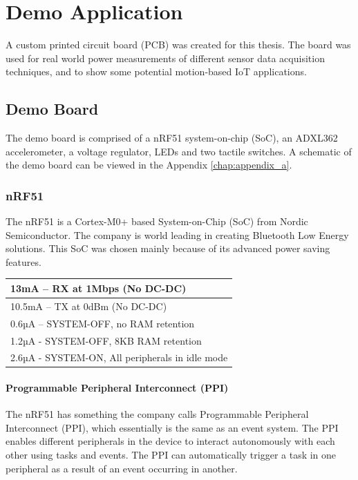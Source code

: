 \chapter{Demo Application}

A custom printed circuit board (PCB) was created for this thesis. The board was used for real world power measurements of different sensor data acquisition techniques, and to show some potential motion-based IoT applications. 

\section{Demo Board}

The demo board is comprised of a nRF51 system-on-chip (SoC), an ADXL362 accelerometer, a voltage regulator, LEDs and two tactile switches. 
A schematic of the demo board can be viewed in the Appendix \ref{chap:appendix_a}. 

\subsection{nRF51}

The nRF51 is a Cortex-M0+ based System-on-Chip (SoC) from Nordic Semiconductor. The company is world leading in creating Bluetooth Low Energy solutions. This SoC was chosen mainly because of its advanced power saving features. 

\begin{center}
    \begin{tabular}{| l |}
    \hline
    13mA – RX at 1Mbps (No DC-DC) \\ \hline
    10.5mA – TX at 0dBm (No DC-DC) \\ \hline
    0.6µA – SYSTEM-OFF, no RAM retention \\ \hline
    1.2µA - SYSTEM-OFF, 8KB RAM retention \\ \hline
    2.6µA - SYSTEM-ON, All peripherals in idle mode \\ \hline
    \end{tabular}
\end{center}

\subsubsection{Programmable Peripheral Interconnect (PPI)}

The nRF51 has something the company calls Programmable Peripheral Interconnect (PPI), which essentially is the same as an event system. The PPI enables different peripherals in the device to interact autonomously with each other using tasks and events. The PPI can automatically trigger a task in one peripheral as a result of an event occurring in another. 


